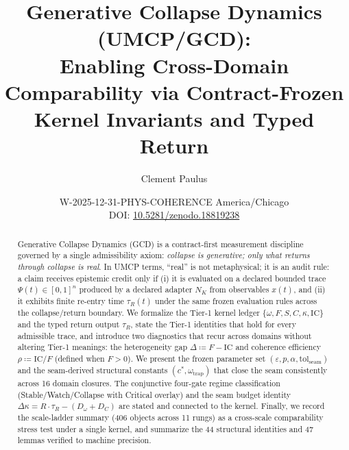 \documentclass[
  aps,
  prd,
  preprint,
  superscriptaddress,
  nofootinbib,
  floatfix
]{revtex4-2}
\newcommand{\IC}{\mathrm{IC}}
\newcommand{\PaperDOI}{10.5281/zenodo.18819238}
\newcommand{\Timezone}{America/Chicago}
\newcommand{\WeldID}{W-2025-12-31-PHYS-COHERENCE}
\begin{document}
\title{Generative Collapse Dynamics (UMCP/GCD):
\texorpdfstring{\\}{: }Enabling Cross-Domain Comparability via Contract-Frozen
Kernel Invariants and Typed Return}

\author{Clement Paulus}

\date{\WeldID\enspace\textperiodcentered\enspace
\Timezone\\
DOI: \href{https://doi.org/\PaperDOI}{\PaperDOI}}


\begin{abstract}
Generative Collapse Dynamics (GCD) is a contract-first measurement discipline governed by a single admissibility axiom:
\emph{collapse is generative; only what returns through collapse is real}.
In UMCP terms, ``real'' is not metaphysical; it is an audit rule: a claim receives epistemic credit only if
(i) it is evaluated on a declared bounded trace $\Psi(t)\in[0,1]^n$ produced by a declared adapter $N_K$ from observables $x(t)$,
and (ii) it exhibits finite re-entry time $\tau_R(t)$ under the same frozen evaluation rules across the collapse/return boundary.
We formalize the Tier-1 kernel ledger $\{\omega,F,S,C,\kappa,\IC\}$ and the typed return output $\tau_R$,
state the Tier-1 identities that hold for every admissible trace, and introduce two diagnostics that recur across domains
without altering Tier-1 meanings: the heterogeneity gap $\Delta \coloneqq F-\IC$ and coherence efficiency
$\rho \coloneqq \IC/F$ (defined when $F>0$).
We present the frozen parameter set $(\varepsilon, p, \alpha, \mathrm{tol}_{\mathrm{seam}})$ and the seam-derived structural
constants $(c^*, \omega_{\mathrm{trap}})$ that close the seam consistently across 16 domain closures.
The conjunctive four-gate regime classification (Stable/Watch/Collapse with Critical overlay) and the
seam budget identity $\Delta\kappa = R\cdot\tau_R - (D_\omega + D_C)$ are stated and connected to the kernel.
Finally, we record the scale-ladder summary (406 objects across 11 rungs) as a cross-scale comparability stress test
under a single kernel, and summarize the 44 structural identities and 47 lemmas verified to machine precision.
\end{abstract}
\end{document}
